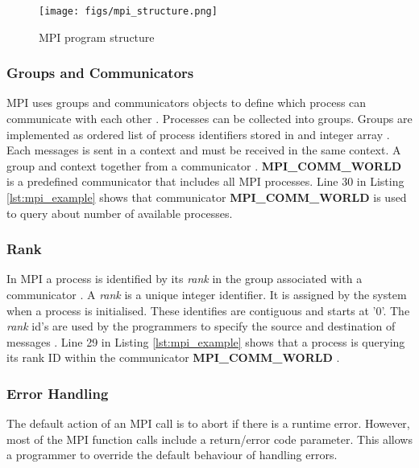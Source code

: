 \begin{figure}[!htb]
\begin{center}
  \texttt{[image: figs/mpi\_structure.png]}
  \caption{MPI program structure}
  \label{fig:mpi_structure}
  \end{center}
\end{figure}

\subsubsection{Groups and Communicators}
MPI uses groups and communicators objects to define which process can communicate with each other \citep{Barney:16-mpi}. Processes can be collected into groups. Groups are implemented as ordered list of process identifiers stored in and integer array \citep{Gropp:96}. Each messages is sent in a context and must be received in the same context. A group and context together from a communicator \citep{Gropp:99}. \textbf{MPI\_COMM\_WORLD} is a predefined communicator that includes all MPI processes. Line 30 in Listing \ref{lst:mpi_example} shows that communicator \textbf{MPI\_COMM\_WORLD}  is used to query about number of available processes. 

\subsubsection{Rank}
In MPI  a process is identified by its \emph{rank} in the group associated with a communicator \citep{Gropp:99}. A \emph{rank} is a unique integer identifier. It is assigned by the system when a process is initialised. These identifies are contiguous and starts at '0'. The \emph{rank} id's are used by the programmers to specify the source and destination of messages \citep{Barney:16-mpi}.  Line 29 in Listing \ref{lst:mpi_example} shows that a process is querying its rank ID within the communicator \textbf{MPI\_COMM\_WORLD} .

\subsubsection{Error Handling}
The default action of an MPI call is to abort if there is a runtime error. However, most of the MPI function calls include a return/error code parameter. This allows a programmer to override the default behaviour of handling errors. \citep{Barney:16-mpi}

